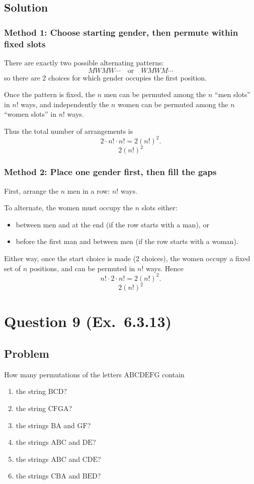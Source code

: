 \documentclass[12pt]{article}
\begin{document}
\subsection{Solution}

\subsubsection{Method 1: Choose starting gender, then permute within fixed slots}
There are exactly two possible alternating patterns:
\[
M W M W \cdots \quad\text{or}\quad W M W M \cdots
\]
so there are $2$ choices for which gender occupies the first position.

Once the pattern is fixed, the $n$ men can be permuted among the $n$ ``men slots'' in $n!$ ways, and independently the $n$ women can be permuted among the $n$ ``women slots'' in $n!$ ways.

Thus the total number of arrangements is
\[
2\cdot n!\cdot n! = 2(n!)^2.
\]
\[
\boxed{2(n!)^2}
\]

\subsubsection{Method 2: Place one gender first, then fill the gaps}
First, arrange the $n$ men in a row: $n!$ ways.

To alternate, the women must occupy the $n$ slots either:
\begin{itemize}[leftmargin=*]
\item between men and at the end (if the row starts with a man), or
\item before the first man and between men (if the row starts with a woman).
\end{itemize}
Either way, once the start choice is made (2 choices), the women occupy a fixed set of $n$ positions, and can be permuted in $n!$ ways. Hence
\[
n!\cdot 2\cdot n! = 2(n!)^2.
\]
\[
\boxed{2(n!)^2}
\]

\newpage

\section{Question 9 (Ex.\ 6.3.13)}
\subsection{Problem}
How many permutations of the letters $\text{ABCDEFG}$ contain
\begin{enumerate}[label=(\alph*)]
\item the string $\text{BCD}$?
\item the string $\text{CFGA}$?
\item the strings $\text{BA}$ and $\text{GF}$?
\item the strings $\text{ABC}$ and $\text{DE}$?
\item the strings $\text{ABC}$ and $\text{CDE}$?
\item the strings $\text{CBA}$ and $\text{BED}$?
\end{enumerate}
\end{document}
